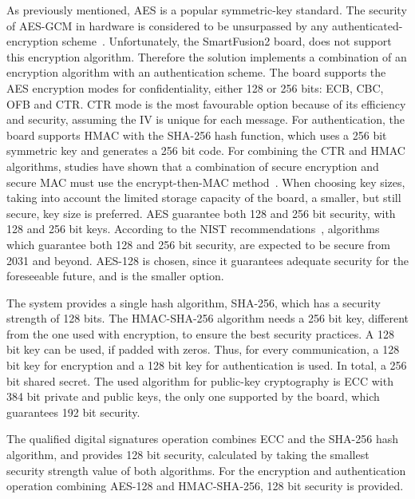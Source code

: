 As previously mentioned, \ac{AES} is a popular symmetric-key standard. The security of \ac{AES}-\ac{GCM} in hardware is considered to be unsurpassed by any authenticated-encryption scheme~\cite{aesmodes}.
Unfortunately, the SmartFusion2 board, does not support this encryption algorithm. Therefore the solution implements a combination of an encryption algorithm with an authentication scheme. The board supports the \ac{AES} encryption modes for confidentiality, either 128 or 256 bits: \ac{ECB}, \ac{CBC}, \ac{OFB} and \ac{CTR}. CTR mode is the most favourable option because of its efficiency and security, assuming the IV is unique for each message.
For authentication, the board supports \ac{HMAC} with the \ac{SHA}-256 hash function, which uses a 256 bit symmetric key and generates a 256 bit code. For combining the CTR and HMAC algorithms, studies have shown that a combination of secure encryption and secure MAC must use the encrypt-then-MAC method~\cite{encryptmacorder}.
When choosing key sizes, taking into account the limited storage capacity of the board, a smaller, but still secure, key size is preferred. \ac{AES} guarantee both 128 and 256 bit security, with 128 and 256 bit keys. According to the \ac{NIST} recommendations~\cite{nistRecommendations}, algorithms which guarantee both 128 and 256 bit security, are expected to be secure from 2031 and beyond. \ac{AES}-128 is chosen, since it guarantees adequate security for the foreseeable future, and is the smaller option.

The system provides a single hash algorithm, \ac{SHA}-256, which has a security strength of 128 bits.
The \ac{HMAC}-\ac{SHA}-256 algorithm needs a 256 bit key, different from the one used with encryption, to ensure the best security practices. A 128 bit key can be used, if padded with zeros. Thus, for every communication, a 128 bit key for encryption and a 128 bit key for authentication is used. In total, a 256 bit shared secret.
The used algorithm for public-key cryptography is \ac{ECC} with 384 bit private and public keys, the only one supported by the board, which guarantees 192 bit security.

The qualified digital signatures operation combines \ac{ECC} and the \ac{SHA}-256 hash algorithm, and provides 128 bit security, calculated by taking the smallest security strength value of both algorithms. For the encryption and authentication operation combining \ac{AES}-128 and \ac{HMAC}-\ac{SHA}-256, 128 bit security is provided.

